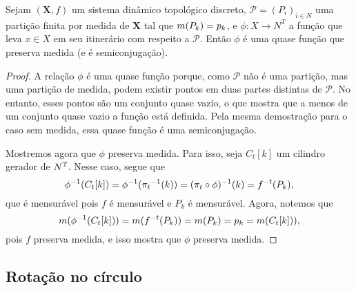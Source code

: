 \begin{proposition}
Sejam $(\bm X,f)$ um sistema dinâmico topológico discreto, $\mathcal P=(P_i)_{i \in N}$ uma partição finita por medida de $\bm X$ tal que $m(P_k)=p_k$, e $\phi: X \to N^T$ a função que leva $x \in X$ em seu itinerário com respeito a $\mathcal{P}$. Então $\phi$ é uma quase função que preserva medida (e é semiconjugação).
\end{proposition}
\begin{proof}
A relação $\phi$ é uma quase função porque, como $\mathcal P$ não é uma partição, mas uma partição de medida, podem existir pontos em duas partes distintas de $\mathcal P$. No entanto, esses pontos são um conjunto quase vazio, o que mostra que a menos de um conjunto quase vazio a função está definida. Pela mesma demostração para o caso sem medida, essa quase função é uma semiconjugação.

Mostremos agora que $\phi$ preserva medida. Para isso, seja $C_t[k]$ um cilindro gerador de $N^{\mathbb{T}}$. Nesse caso, segue que
	\begin{equation*}
	\phi^{-1}(C_t[k]) = \phi^{-1}({\pi_t}^{-1}(k)) = (\pi_t \circ \phi)^{-1}(k) = f^{-t}(P_k),
	\end{equation*}
que é mensurável pois $f$ é mensurável e $P_k$ é mensurável. Agora, notemos que
	\begin{equation*}
	m(\phi^{-1}(C_t[k])) = m(f^{-t}(P_k)) = m(P_k) = p_k = m(C_t[k])),
	\end{equation*}
pois $f$ preserva medida, e isso mostra que $\phi$ preserva medida.
\end{proof}


\subsection{Rotação no círculo}

